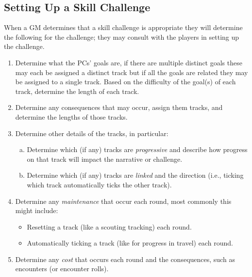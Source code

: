 \subsection{Setting Up a Skill Challenge}
When a GM determines that a skill challenge is appropriate they will determine the following for the challenge; they may consult with the players in setting up the challenge.
\begin{enumerate}
  \item Determine what the PCs' goals are, if there are multiple distinct goals these may each be assigned a distinct track but if all the goals are related they may be assigned to a single track.
    Based on the difficulty of the goal(s) of each track, determine the length of each track.
  \item Determine any consequences that may occur, assign them tracks, and determine the lengths of those tracks.
  \item Determine other details of the tracks, in particular:
  \begin{enumerate}[a.]
    \item Determine which (if any) tracks are \emph{progressive} and describe how progress on that track will impact the narrative or challenge.
    \item Determine which (if any) tracks are \emph{linked} and the direction (i.e., ticking which track automatically ticks the other track).
  \end{enumerate}
  \item Determine any \emph{maintenance} that occur each round, most commonly this might include:
  \begin{itemize}
    \item Resetting a track (like a scouting tracking) each round.
    \item Automatically ticking a track (like for progress in travel) each round.
  \end{itemize}
  \item Determine any \emph{cost} that occurs each round and the consequences, such as encounters (or encounter rolls).
\end{enumerate}

